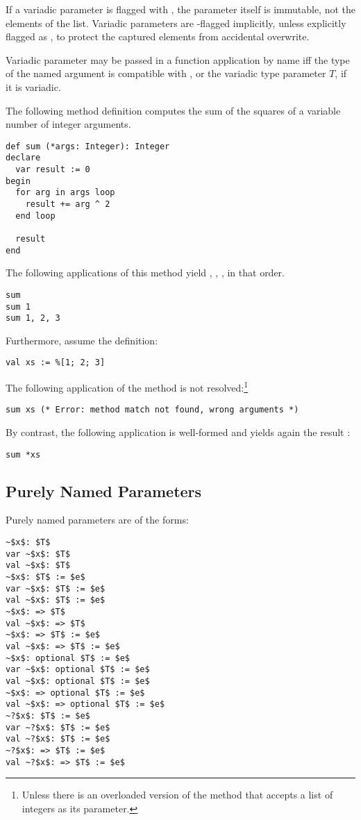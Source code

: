 If a variadic parameter is flagged with , the parameter itself is immutable, not the elements of the list. Variadic parameters are -flagged implicitly, unless explicitly flagged as , to protect the captured elements from accidental overwrite. 

Variadic parameter may be passed in a function application by name iff the type of the named argument is compatible with , or the variadic type parameter $T$, if it is variadic. 

\example The following method definition computes the sum of the squares of a variable number of integer arguments.
\begin{lstlisting}
def sum (*args: Integer): Integer
declare
  var result := 0
begin
  for arg in args loop
    result += arg ^ 2
  end loop
  
  result
end
\end{lstlisting}
The following applications of this method yield , , , in that order.
\begin{lstlisting}
sum
sum 1
sum 1, 2, 3
\end{lstlisting}
Furthermore, assume the definition:
\begin{lstlisting}
val xs := %[1; 2; 3]
\end{lstlisting}
The following application of the method  is not resolved:\footnote{Unless there is an overloaded version of the method that accepts a list of integers as its parameter.}
\begin{lstlisting}
sum xs (* Error: method match not found, wrong arguments *)
\end{lstlisting}
By contrast, the following application is well-formed and yields again the result :
\begin{lstlisting}
sum *xs
\end{lstlisting}






\subsection{Purely Named Parameters}
\label{sec:named-parameters}
\label{sec:capturing-named-parameter}

Purely named parameters are of the forms:
\begin{lstlisting}
~$x$: $T$
var ~$x$: $T$
val ~$x$: $T$
~$x$: $T$ := $e$
var ~$x$: $T$ := $e$
val ~$x$: $T$ := $e$
~$x$: => $T$
val ~$x$: => $T$
~$x$: => $T$ := $e$
val ~$x$: => $T$ := $e$
~$x$: optional $T$ := $e$
var ~$x$: optional $T$ := $e$
val ~$x$: optional $T$ := $e$
~$x$: => optional $T$ := $e$
val ~$x$: => optional $T$ := $e$
~?$x$: $T$ := $e$
var ~?$x$: $T$ := $e$
val ~?$x$: $T$ := $e$
~?$x$: => $T$ := $e$
val ~?$x$: => $T$ := $e$
\end{lstlisting}

